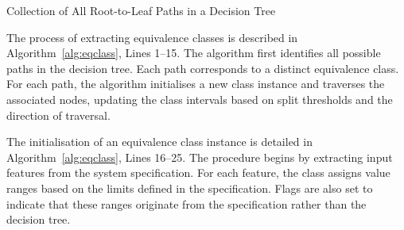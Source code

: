 \documentclass[
]{ceurart}
\theoremstyle{definition}
\begin{document}
\begin{algorithm}
\caption{Collection of All Root-to-Leaf Paths in a Decision Tree~\cite{traversal}}
\label{alg:paths}


\vspace{0.5em}


\end{algorithm}

The process of extracting equivalence classes is described in Algorithm~\ref{alg:eqclass}, Lines 1–15. The algorithm first identifies all possible paths in the decision tree. Each path corresponds to a distinct equivalence class. For each path, the algorithm initialises a new class instance and traverses the associated nodes, updating the class intervals based on split thresholds and the direction of traversal.

The initialisation of an equivalence class instance is detailed in Algorithm~\ref{alg:eqclass}, Lines 16–25. The procedure begins by extracting input features from the system specification. For each feature, the class assigns value ranges based on the limits defined in the specification. Flags are also set to indicate that these ranges originate from the specification rather than the decision tree.
\end{document}
